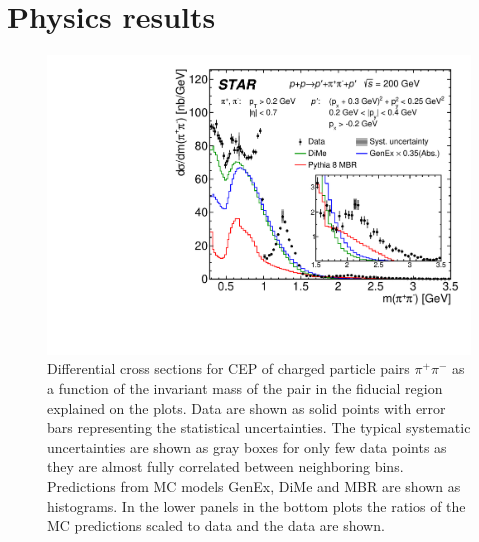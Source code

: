 

\chapter{Physics results}\label{chap:physicsResults}


\begin{figure}[h]
\centering
\includegraphics[width=.7\textwidth,page=1]{graphics/physicsResults/FinalResult_InvMass_pion.pdf}
%
\caption{Differential cross sections for CEP of charged particle pairs $\pi^+\pi^-$ as a function of the invariant mass of the pair in the fiducial region explained on the plots. Data are shown as solid points with error bars representing the statistical uncertainties. The typical systematic uncertainties are shown as gray boxes for only few data points as they are almost fully correlated between neighboring bins. Predictions from MC models GenEx, DiMe and MBR are shown as histograms. In the lower panels in the bottom plots the ratios of the MC predictions scaled to data and the data are shown.}
\label{results_01}
\end{figure}
%
